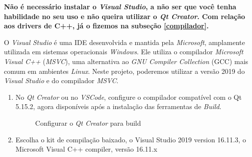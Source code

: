 \documentclass[a4paper,11pt]{article}
\newcommand{\qtcreator}{\textit{Qt Creator}}
\newcommand{\vscode}{\textit{VSCode}}
\newcommand{\visualstudio}{\textit{Visual Studio}}
\newcommand{\msvc}{\textit{MSVC}}
\newcommand{\windows}{\textit{Windows}}
\newcommand{\linux}{\textit{Linux}}
\newcommand{\cautionbox}[1]{
	\vskip 5mm
	\begin{leftbar}
		\textbf{#1}
	\end{leftbar}
	\vskip 5mm
}
\begin{document}
\cautionbox{\color{blue}Não é necessário instalar o \visualstudio{}, a não ser que você tenha habilidade no seu uso e não queira utilizar o \qtcreator{}.
Com relação aos drivers de C++, já o fizemos na subseção \ref{compilador}.
 }

O \visualstudio{} é uma IDE desenvolvida e mantida pela \textit{Microsoft}, amplamente utilizada em sistemas operacionais \windows{}. Ele utiliza o compilador \emph{Microsoft Visual C++} (\msvc{}), uma alternativa ao \emph{GNU Compiler Collection} (GCC) mais comum em ambientes \linux{}. Neste projeto, poderemos utilizar a versão 2019 do \visualstudio{} e do compilador \msvc{}.

\begin{enumerate}

\item No \qtcreator{} ou no \vscode{}, configure o compilador compatível com o Qt 5.15.2, agora disponíveis após a instalação das ferramentas de \textit{Build}.

\begin{figure}[H]
	\centering
	\caption{Configurar o \qtcreator{} para build}\label{fig:qt_tools_ext_config}
\end{figure}

\item Escolha o kit de compilação baixado, o Visual Studio 2019 version 16.11.3, o Microsoft Visual C++ compiler, versão 16.11.x


\end{enumerate}
\end{document}
